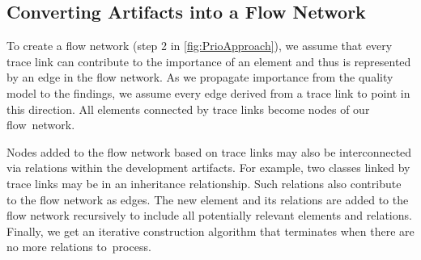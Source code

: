 \subsection{Converting Artifacts into a Flow Network}
\label{sec:flownetwork}
%
%
To create a flow network (step 2 in \autoref{fig:PrioApproach}), we assume that every trace link can contribute to the importance of an element and
thus
is %
represented by an edge in the flow network. As we %
propagate importance from the quality model to the findings, we assume every edge derived from a trace link to point in this direction. All elements connected by trace links become nodes of our flow~network.

Nodes added to the flow network based on trace links may also be interconnected via relations within the development artifacts.
For example, two classes linked by trace links may be in an inheritance relationship.
Such relations also contribute to the flow network as edges.
The new element and its relations are added to the flow network recursively to include all potentially relevant elements and relations.
Finally, we get an iterative construction algorithm that terminates when there are no more relations to~process.

